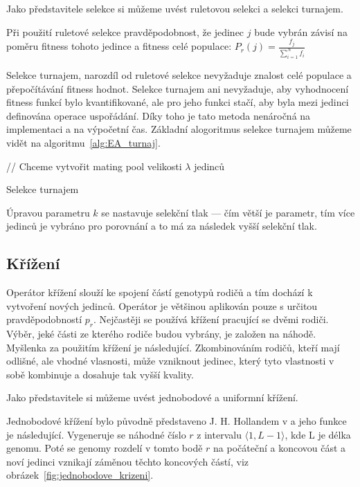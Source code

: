 Jako představitele selekce si můžeme uvést ruletovou selekci a selekci turnajem.

Při použití ruletové selekce pravděpodobnost, že jedinec $j$ bude vybrán závisí na poměru fitness tohoto jedince a fitness celé populace:
$P_r(j) = \frac{f_j}{\sum_{i=1}^{N}f_i}$

Selekce turnajem, narozdíl od ruletové selekce nevyžaduje znalost celé populace a přepočítávání fitness hodnot.
Selekce turnajem ani nevyžaduje, aby vyhodnocení fitness funkcí bylo kvantifikované, ale pro jeho funkci stačí, aby byla mezi jedinci definována operace uspořádání.
Díky toho je tato metoda nenáročná na implementaci a na výpočetní čas.
Základní alogoritmus selekce turnajem můžeme vidět na algoritmu~\ref{alg:EA_turnaj}.

\begin{algorithm}[H]
    // Chceme vytvořit mating pool velikosti $\lambda$ jedinců\;
    \caption{Selekce turnajem}
    \label{alg:EA_turnaj}
\end{algorithm}

Úpravou parametru $k$ se nastavuje selekční tlak --- čím větší je parametr, tím více jedinců je vybráno pro porovnání a to má za následek vyšší selekční tlak.

\subsection{Křížení}
Operátor křížení slouží ke spojení částí genotypů rodičů a tím dochází k vytvoření nových jedinců.
Operátor je většinou aplikován pouze s určitou pravděpodobností $p_r$.
Nejčastěji se používá křížení pracující se dvěmi rodiči.
Výběr, jeké části ze kterého rodiče budou vybrány, je založen na náhodě.
Myšlenka za použitím křížení je následující.
Zkombinováním rodičů, kteří mají odlišné, ale vhodné vlasnosti, může vzniknout jedinec, který tyto vlastnosti v sobě kombinuje a dosahuje tak vyšší kvality.

Jako představitele si můžeme uvést jednobodové a uniformní křížení.

Jednobodové křížení bylo původně představeno J. H. Hollandem v  a jeho funkce je následující.
Vygeneruje se náhodné číslo $r$ z intervalu $\langle 1, L-1\rangle$, kde L je délka genomu.
Poté se genomy rozdelí v tomto bodě $r$ na počáteční a koncovou část a noví jedinci vznikají záměnou těchto koncových částí, viz obrázek~\ref{fig:jednobodove_krizeni}.

